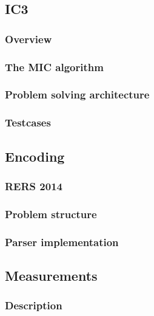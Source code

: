 \documentclass[a4paper]{article}
\begin{document}
\subsection{IC3}
\subsubsection{Overview}
\subsubsection{The MIC algorithm}
\subsubsection{Problem solving architecture}
\subsubsection{Testcases}

\subsection{Encoding} %
\subsubsection{RERS 2014}
\subsubsection{Problem structure}
\subsubsection{Parser implementation}

\subsection{Measurements}
\subsubsection{Description}
\end{document}
